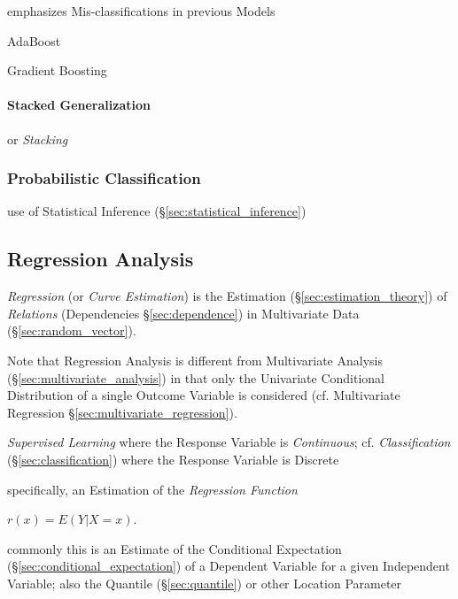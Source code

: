 emphasizes Mis-classifications in previous Models

AdaBoost

Gradient Boosting



\paragraph{Stacked Generalization}\label{sec:stacked_generalization}\hfill

or \emph{Stacking}



\subsubsection{Probabilistic Classification}
\label{sec:probabilistic_classification}

use of Statistical Inference (\S\ref{sec:statistical_inference})



\subsection{Regression Analysis}\label{sec:regression_analysis}

\emph{Regression} (or \emph{Curve Estimation}) is the Estimation
(\S\ref{sec:estimation_theory}) of \emph{Relations} (Dependencies
\S\ref{sec:dependence}) in Multivariate Data (\S\ref{sec:random_vector}).

Note that Regression Analysis is different from Multivariate Analysis
(\S\ref{sec:multivariate_analysis}) in that only the Univariate Conditional
Distribution of a single Outcome Variable is considered (cf. Multivariate
Regression \S\ref{sec:multivariate_regression}).

\emph{Supervised Learning} where the Response Variable is \emph{Continuous}; cf.
\emph{Classification} (\S\ref{sec:classification}) where the Response Variable
is Discrete

specifically, an Estimation of the \emph{Regression Function}

$r(x) = E(Y | X = x)$.

commonly this is an Estimate of the Conditional Expectation
(\S\ref{sec:conditional_expectation}) of a Dependent Variable for a given
Independent Variable; also the Quantile (\S\ref{sec:quantile}) or other Location
Parameter

